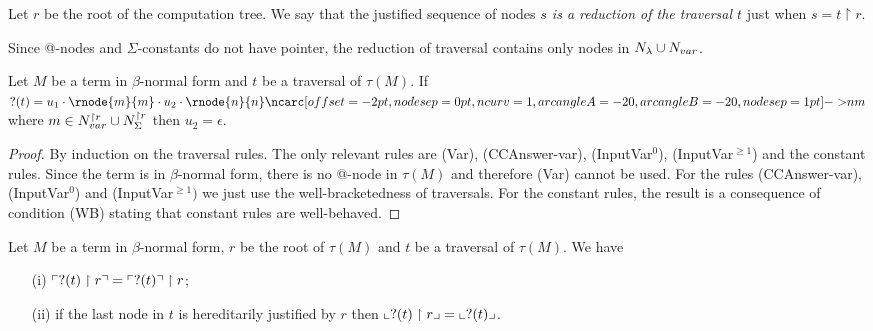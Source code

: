 \begin{dfn}
Let $r$ be the root of the computation tree. We say that the
justified sequence of nodes \emph{$s$ is a reduction of the
traversal $t$} just when $s = t \upharpoonright r$.
\end{dfn}

Since @-nodes and $\Sigma$-constants do not have pointer, the
reduction of traversal contains only nodes in $N_\lambda \cup
N_{var}$.


\begin{lem}
\label{lem:var_followedby_child} Let $M$ be a term in $\beta$-normal
form and $t$ be a traversal of $\tau(M)$. If $?(t) = u_1 \cdot
\rnode{m}{m} \cdot u_2 \cdot \rnode{n}{n}
\bkptr[nodesep=1pt]{20}{n}{m}$ where $m \in N^{\upharpoonright r}_{var} \cup N^{\upharpoonright r}_{\Sigma}$ 
then $u_2 = \epsilon$.
\end{lem}
\begin{proof}
By induction on the traversal rules. The only relevant rules are (Var), (CCAnswer-var), (InputVar$^0$), (InputVar$^{\geq 1}$)
and the constant rules.
Since the term is in $\beta$-normal form, there is no @-node in $\tau(M)$ and therefore (Var) cannot be used.
For the rules (CCAnswer-var), (InputVar$^0$) and (InputVar$^{\geq 1})$ we just use the well-bracketedness of traversals.
For the constant rules, the result is a consequence of condition (WB) stating that constant rules are well-behaved.
\end{proof}

\begin{lem}
\label{lem:redtrav_trav} Let $M$ be a term in $\beta$-normal form,
$r$ be the root of $\tau(M)$ and $t$ be a traversal of $\tau(M)$. We
have
\begin{itemize}
\item[(i)] $ \ulcorner ?(t) \upharpoonright  r  \urcorner = \ulcorner ?(t) \urcorner \upharpoonright r$;
\item[(ii)] if the last node in $t$ is hereditarily justified by $r$ then $ \llcorner ?(t) \upharpoonright r  \lrcorner = \llcorner ?(t) \lrcorner$.
\end{itemize}
\end{lem}

